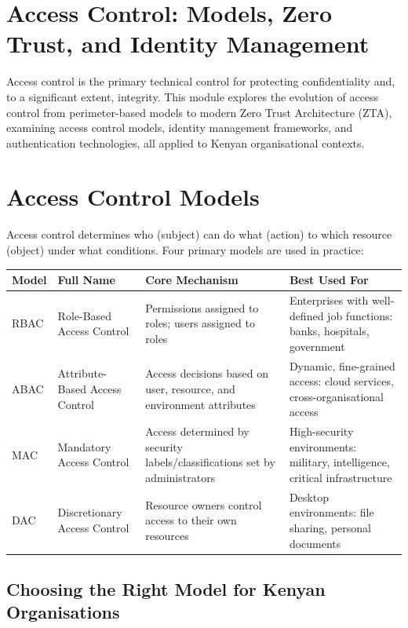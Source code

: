 \documentclass[12pt,a4paper]{article}
\begin{document}
\section*{Access Control: Models, Zero Trust, and Identity Management}

Access control is the primary technical control for protecting confidentiality and, to a significant extent, integrity. This module explores the evolution of access control from perimeter-based models to modern Zero Trust Architecture (ZTA), examining access control models, identity management frameworks, and authentication technologies, all applied to Kenyan organisational contexts.

\section{Access Control Models}

Access control determines who (subject) can do what (action) to which resource (object) under what conditions. Four primary models are used in practice:

\begin{center}
\renewcommand{\arraystretch}{1.4}
\begin{tabular}{|l|l|p{4cm}|p{4.5cm}|}
\hline
\textbf{Model} & \textbf{Full Name} & \textbf{Core Mechanism} & \textbf{Best Used For} \\
\hline
RBAC & Role-Based Access Control & Permissions assigned to roles; users assigned to roles & Enterprises with well-defined job functions: banks, hospitals, government \\
\hline
ABAC & Attribute-Based Access Control & Access decisions based on user, resource, and environment attributes & Dynamic, fine-grained access: cloud services, cross-organisational access \\
\hline
MAC & Mandatory Access Control & Access determined by security labels/classifications set by administrators & High-security environments: military, intelligence, critical infrastructure \\
\hline
DAC & Discretionary Access Control & Resource owners control access to their own resources & Desktop environments: file sharing, personal documents \\
\hline
\end{tabular}
\end{center}

\subsection{Choosing the Right Model for Kenyan Organisations}
\end{document}
